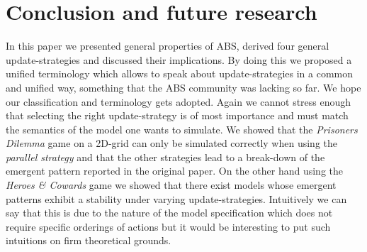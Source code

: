 \section{Conclusion and future research}
In this paper we presented general properties of ABS, derived four general update-strategies and discussed their implications. By doing this we proposed a unified terminology which allows to speak about update-strategies in a common and unified way, something that the ABS community was lacking so far. We hope our classification and terminology gets adopted. Again we cannot stress enough that selecting the right update-strategy is of most importance and must match the semantics of the model one wants to simulate.
We showed that the \textit{Prisoners Dilemma} game on a 2D-grid can only be simulated correctly when using the \textit{parallel strategy} and that the other strategies lead to a break-down of the emergent pattern reported in the original paper. On the other hand using the \textit{Heroes \& Cowards} game we showed that there exist models whose emergent patterns exhibit a stability under varying update-strategies. Intuitively we can say that this is due to the nature of the model specification which does not require specific orderings of actions but it would be interesting to put such intuitions on firm theoretical grounds.